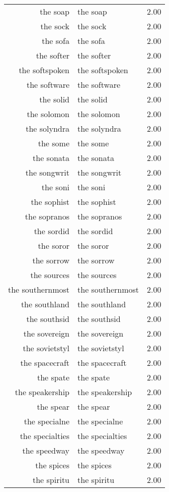 \begin{table}[ht]
\begin{tabular}{rlr}
  the soap & the soap & 2.00 \\ 
  the sock & the sock & 2.00 \\ 
  the sofa & the sofa & 2.00 \\ 
  the softer & the softer & 2.00 \\ 
  the softspoken & the softspoken & 2.00 \\ 
  the software & the software & 2.00 \\ 
  the solid & the solid & 2.00 \\ 
  the solomon & the solomon & 2.00 \\ 
  the solyndra & the solyndra & 2.00 \\ 
  the some & the some & 2.00 \\ 
  the sonata & the sonata & 2.00 \\ 
  the songwrit & the songwrit & 2.00 \\ 
  the soni & the soni & 2.00 \\ 
  the sophist & the sophist & 2.00 \\ 
  the sopranos & the sopranos & 2.00 \\ 
  the sordid & the sordid & 2.00 \\ 
  the soror & the soror & 2.00 \\ 
  the sorrow & the sorrow & 2.00 \\ 
  the sources & the sources & 2.00 \\ 
  the southernmost & the southernmost & 2.00 \\ 
  the southland & the southland & 2.00 \\ 
  the southsid & the southsid & 2.00 \\ 
  the sovereign & the sovereign & 2.00 \\ 
  the sovietstyl & the sovietstyl & 2.00 \\ 
  the spacecraft & the spacecraft & 2.00 \\ 
  the spate & the spate & 2.00 \\ 
  the speakership & the speakership & 2.00 \\ 
  the spear & the spear & 2.00 \\ 
  the specialne & the specialne & 2.00 \\ 
  the specialties & the specialties & 2.00 \\ 
  the speedway & the speedway & 2.00 \\ 
  the spices & the spices & 2.00 \\ 
  the spiritu & the spiritu & 2.00 \\ 

\end{tabular}
\end{table}
